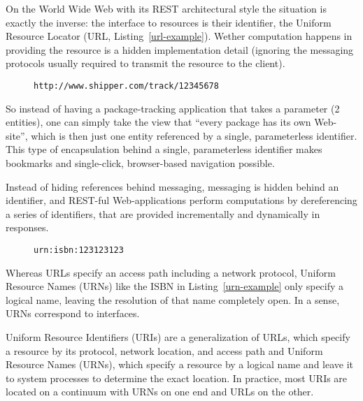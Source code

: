 \documentclass[preprint,authoryear]{acm_proc_article-sp}
\begin{document}
On the World Wide Web with its REST architectural style the situation is exactly the inverse: 
the interface to resources is their identifier, the Uniform Resource Locator (URL, Listing~\ref{url-example}).
Wether computation happens in providing the resource is a hidden implementation detail
(ignoring the messaging protocols usually required to transmit the resource
to the client).  


\begin{figure}[htbp]
\begin{lstlisting}[style=L,label=url-example,caption=A Uniform Resource Locator.]
http://www.shipper.com/track/12345678
\end{lstlisting}
\end{figure}

So instead of having
a package-tracking application that takes a parameter (2 entities),
one can simply take the view that ``every package has its own 
Web-site'', which is then just one entity referenced by a single,
parameterless identifier.  This type of encapsulation behind
a single, parameterless identifier makes bookmarks and single-click,
browser-based navigation possible.


Instead of hiding references behind messaging,
messaging is hidden behind an identifier, and REST-ful Web-applications
perform computations by dereferencing a series of identifiers, that 
are provided incrementally and dynamically in responses.


\begin{figure}[htbp]
\begin{lstlisting}[style=L,label=urn-example,caption=A Uniform Resource Name.]
urn:isbn:123123123
\end{lstlisting}
\end{figure}

Whereas URLs specify an access path including a network protocol, Uniform 
Resource Names (URNs) like the ISBN in Listing~\ref{urn-example} only specify a logical
name, leaving the resolution of that name completely open.  In a sense, URNs
correspond to interfaces.

Uniform Resource Identifiers (URIs) are a generalization of URLs, which specify a
resource by its protocol, network location, and access path and Uniform Resource Names (URNs),
which specify
a resource by a logical name and leave it to system processes to 
determine the exact location.  In practice, most URIs are located on
a continuum with URNs on one end and URLs on the other.

\end{document}
